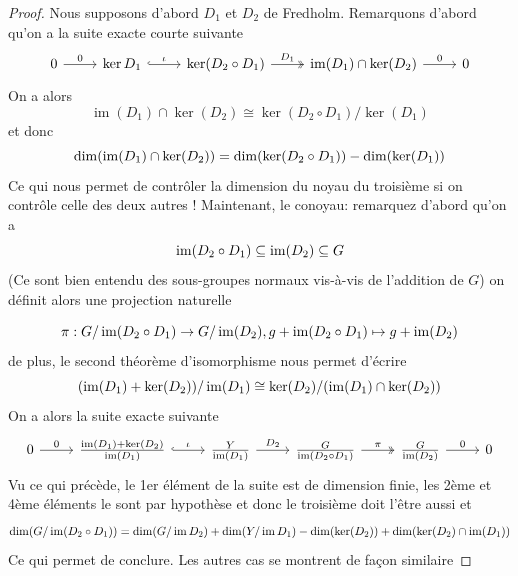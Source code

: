 \documentclass[memoire.tex]{subfiles}
\begin{document}
\begin{proof}
    Nous supposons d'abord $D_1$ et $D_2$ de Fredholm.
    Remarquons d'abord qu'on a la suite exacte courte suivante
    \[\begin{tikzcd}
	0 & {\ker D_1} & {\ker (D_2\circ D_1)} & {\operatorname{im}(D_1)\cap \ker (D_2)} & 0
	\arrow["0", from=1-1, to=1-2]
	\arrow["\iota", hook, from=1-2, to=1-3]
	\arrow["{D_1}", two heads, from=1-3, to=1-4]
	\arrow["0", from=1-4, to=1-5]
    \end{tikzcd}\]
On a alors
    \begin{equation*}
        \operatorname{im}(D_1)\cap \ker (D_2) \cong \ker (D_2\circ D_1)/\ker (D_1)
    \end{equation*}
et donc
\begin{equation*}
    \dim (\operatorname{im} (D_1)\cap \ker (D_2))= \dim(\ker (D_2\circ D_1))-\dim(\ker (D_1))
\end{equation*}
Ce qui nous permet de contrôler la dimension du noyau du troisième si on contrôle celle des deux autres ! Maintenant, le conoyau: remarquez d'abord qu'on a
\begin{equation*}
    \operatorname{im}(D_2\circ D_1)\subseteq \operatorname{im}(D_2)\subseteq G
\end{equation*}
(Ce sont bien entendu des sous-groupes normaux vis-à-vis de l'addition de $G$) on définit alors une projection naturelle

\begin{equation*}
    \pi : G/\operatorname{im}(D_2\circ D_1)\rightarrow 
    G/\operatorname{im}(D_2), g+\operatorname{im}(D_2\circ D_1)\mapsto g+\operatorname{im}(D_2) 
\end{equation*}
de plus, le second théorème d'isomorphisme nous permet d'écrire
\begin{equation*}
    (\operatorname{im}(D_1)+\ker(D_2))/\operatorname{im}(D_1)\cong \ker(D_2)/(\operatorname{im}(D_1)\cap \ker(D_2) )
\end{equation*}
On a alors la suite exacte suivante
\[\begin{tikzcd}
	0 & {\frac{\operatorname{im} (D_1)+\ker(D_2)}{\operatorname{im} (D_1)}} & {\frac{Y}{\operatorname{im} (D_1)}} & {\frac{G}{\operatorname{im} (D_2\circ D_1)}} & { \frac{G}{\operatorname{im}(D_2)}} & 0
	\arrow["0", from=1-1, to=1-2]
	\arrow["\iota", hook, from=1-2, to=1-3]
	\arrow["{D_2}", from=1-3, to=1-4]
	\arrow["\pi", two heads, from=1-4, to=1-5]
	\arrow["0", from=1-5, to=1-6]
\end{tikzcd}\]
Vu ce qui précède, le 1er élément de la suite est de dimension finie, les 2ème et 4ème éléments le sont par hypothèse  et donc le troisième doit l'être aussi et
\begin{equation*}
    \dim(G/\operatorname{im}(D_2\circ D_1)) = \dim(G/\operatorname{im} D_2) + \dim(Y/\operatorname{im} D_1) - \dim(\ker(D_2)) + \dim(\ker(D_2)\cap \operatorname{im}(D_1))
\end{equation*}
Ce qui permet de conclure. Les autres cas se montrent de façon similaire
\end{proof}
\end{document}
